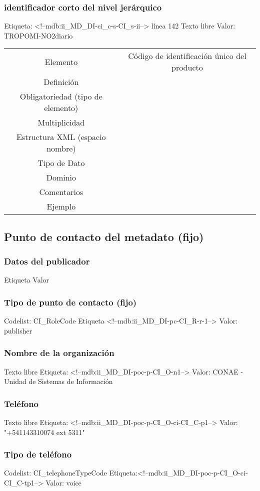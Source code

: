 \documentclass{GVT_CONAE_Class}
\begin{document}
\subsubsection{identificador corto del nivel jerárquico}
Etiqueta: <!--mdb:ii\_MD\_DI-ci\_c-s-CI\_s-ii--> línea 142
Texto libre
Valor: TROPOMI-NO2diario
\begin{tabular}{c|c}
    Elemento & Código de identificación único del producto \\
    Definición & \\
    Obligatoriedad (tipo de elemento) & \\
    Multiplicidad & \\
    Estructura XML (espacio nombre) & \\
    Tipo de Dato & \\
    Dominio & \\
    Comentarios & \\
    Ejemplo & \\
\end{tabular}


\subsection{Punto de contacto del metadato  (fijo)}
\subsubsection{Datos del publicador}
Etiqueta
Valor
\subsubsection{Tipo de punto de contacto (fijo)}
Codelist: CI\_RoleCode
Etiqueta <!--mdb:ii\_MD\_DI-pc-CI\_R-r-1-->
Valor: publisher

\subsubsection{Nombre de la organización}
Texto libre
Etiqueta: <!--mdb:ii\_MD\_DI-poc-p-CI\_O-n1-->
Valor: CONAE - Unidad de Sistemas de Información

\subsubsection{Teléfono}
Texto libre
Etiqueta: <!--mdb:ii\_MD\_DI-poc-p-CI\_O-ci-CI\_C-p1-->
Valor: "+541143310074 ext 5311"

\subsubsection{Tipo de teléfono}
Codelist: CI\_telephoneTypeCode
Etiqueta:<!--mdb:ii\_MD\_DI-poc-p-CI\_O-ci-CI\_C-tp1-->
Valor: voice
\end{document}
